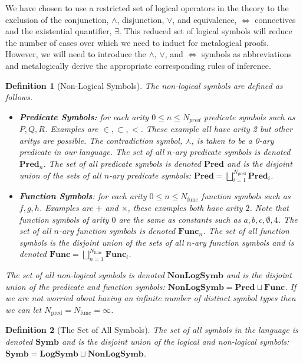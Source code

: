 \documentclass[12pt]{article}
\theoremstyle{break}
\newtheorem{definition}{Definition}[section]
\theoremstyle{break}
\theoremstyle{break}
\theoremstyle{break}
\begin{document}
We have chosen to use a restricted set of logical operators in the theory to the exclusion of the conjunction, $\land$, disjunction, $\lor$, and equivalence, $\iff$ connectives and the existential quantifier, $\exists$.
This reduced set of logical symbols will reduce the number of cases over which we need to induct for metalogical proofs. 
However, we will need to introduce the $\land$, $\lor$, and $\iff$ symbols as abbreviations and metalogically derive the appropriate corresponding rules of inference.

\begin{definition}[Non-Logical Symbols]
The non-logical symbols are defined as follows.
\begin{itemize}
\item{\textbf{Predicate Symbols:} for each arity $0 \le n \le N_{pred}$ predicate symbols such as $P, Q, R$. Examples are $\in, \subset, <$. These example all have arity 2 but other aritys are possible. The contradiction symbol, $\curlywedge$, is taken to be a 0-ary predicate in our language. The set of all $n$-ary predicate symbols is denoted $\textbf{Pred}_n$. The set of all predicate symbols is denoted $\textbf{Pred}$ and is the disjoint union of the sets of all $n$-ary predicate symbols: $\textbf{Pred} = \bigsqcup_{i=1}^{N_{\text{pred}}} \textbf{Pred}_i$.}
\item{\textbf{Function Symbols}: for each arity $0 \le n \le N_{\text{func}}$ function symbols such as $f, g, h$. Examples are $+$ and $\times$, these examples both have arity $2$. Note that function symbols of arity $0$ are the same as constants such as $a,b,c,\emptyset,4$. The set of all $n$-ary function symbols is denoted $\textbf{Func}_n$. The set of all function symbols is the disjoint union of the sets of all $n$-ary function symbols and is denoted $\textbf{Func} = \bigsqcup_{n=1}^{N_{\text{func}}} \textbf{Func}_i$.}
\end{itemize}

The set of all non-logical symbols is denoted $\textbf{NonLogSymb}$ and is the disjoint union of the predicate and function symbols: $\textbf{NonLogSymb} = \textbf{Pred} \sqcup \textbf{Func}$. If we are not worried about having an infinite number of distinct symbol types then we can let $N_{\text{pred}} = N_{\text{func}} = \infty$.
\end{definition}

\begin{definition}[The Set of All Symbols]
The set of all symbols in the language is denoted $\textbf{Symb}$ and is the disjoint union of the logical and non-logical symbols: $\textbf{Symb} = \textbf{LogSymb} \sqcup \textbf{NonLogSymb}$.
\end{definition}
\end{document}
